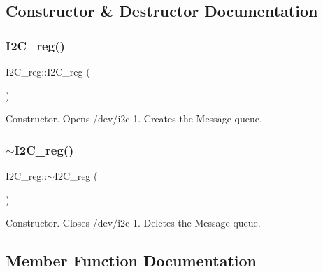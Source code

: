 \subsection{Constructor \& Destructor Documentation}
\mbox{\label{class_i2_c__reg_a720b6a4c79f5065acd067e0c97ba4d72}} 
\subsubsection{\texorpdfstring{I2\+C\+\_\+reg()}{I2C\_reg()}}
{\footnotesize\ttfamily I2\+C\+\_\+reg\+::\+I2\+C\+\_\+reg (\begin{DoxyParamCaption}{ }\end{DoxyParamCaption})\hspace{0.3cm}{\ttfamily [private]}}



Constructor. Opens /dev/i2c-\/1. Creates the Message queue. 

\mbox{\label{class_i2_c__reg_aaeda24970f812b2f805abb71f3e55489}} 
\subsubsection{\texorpdfstring{$\sim$\+I2\+C\+\_\+reg()}{~I2C\_reg()}}
{\footnotesize\ttfamily I2\+C\+\_\+reg\+::$\sim$\+I2\+C\+\_\+reg (\begin{DoxyParamCaption}{ }\end{DoxyParamCaption})\hspace{0.3cm}{\ttfamily [private]}}



Constructor. Closes /dev/i2c-\/1. Deletes the Message queue. 



\subsection{Member Function Documentation}
\mbox{\label{class_i2_c__reg_afb752ee0655db95f5b54c99a351cb574}} 
